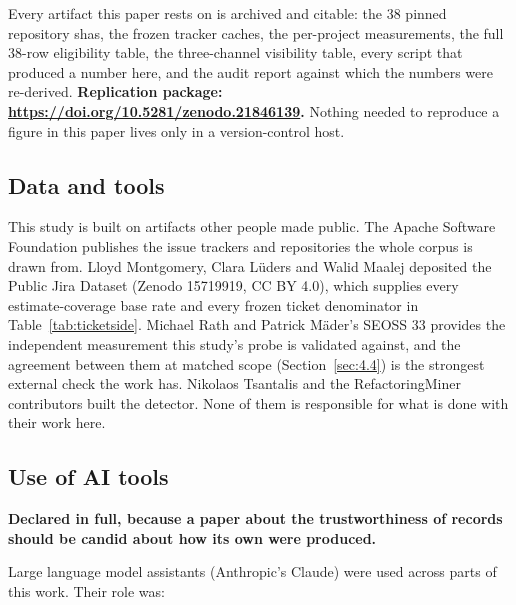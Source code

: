 \documentclass[conference]{IEEEtran}
\begin{document}
Every artifact this paper rests on is archived and citable: the 38 pinned repository shas, the frozen tracker caches, the per-project measurements, the full 38-row eligibility table, the three-channel visibility table, every script that produced a number here, and the audit report against which the numbers were re-derived. \textbf{Replication package: \href{https://doi.org/10.5281/zenodo.21846139}{https://doi.org/10.5281/zenodo.21846139}.} Nothing needed to reproduce a figure in this paper lives only in a version-control host.

\subsection{Data and tools}
\label{sec:8.2}

This study is built on artifacts other people made public. The Apache Software Foundation publishes the issue trackers and repositories the whole corpus is drawn from. Lloyd Montgomery, Clara L\"uders and Walid Maalej deposited the Public Jira Dataset (Zenodo 15719919, CC BY 4.0), which supplies every estimate-coverage base rate and every frozen ticket denominator in Table~\ref{tab:ticketside}. Michael Rath and Patrick M\"ader's SEOSS 33 provides the independent measurement this study's probe is validated against, and the agreement between them at matched scope (Section~\ref{sec:4.4}) is the strongest external check the work has. Nikolaos Tsantalis and the RefactoringMiner contributors built the detector. None of them is responsible for what is done with their work here.

\subsection{Use of AI tools}
\label{sec:8.3}

\textbf{Declared in full, because a paper about the trustworthiness of records should be candid about how its own were produced.}

Large language model assistants (Anthropic's Claude) were used across parts of this work. Their role was:
\end{document}

